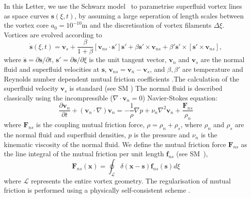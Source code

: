 \documentclass[%
 reprint,
 amsmath,amssymb,
 aps,
 prl,
]{revtex4-2}
\def \s{\mathbf{s}}
\def \v{\mathbf{v}}
\def \x{\mathbf{x}}
\begin{document}
In this Letter, we use the Schwarz model~\cite{schwarz1988} to parametrise superfluid vortex lines as space curves $\s(\xi,t)$, by assuming a large seperation of length scales between the vortex core $a_0=10^{-10}$m and the discretisation of vortex filaments $\Delta\xi$. Vortices are evolved according to
\begin{equation}
    \dot{\s}(\xi,t) = \v_s + \frac{\beta}{1+\beta}\left[\v_{ns}\cdot\s'\right]\s' + \beta\s'\times\v_{ns} + \beta'\s'\times\left[\s'\times\v_{ns}\right],
\end{equation}
where $\dot{\s} = \partial\s/\partial t$, $\s' = \partial\s/\partial\xi$ is the unit tangent vector, $\v_n$ and $\v_s$ are the normal fluid and superfluid velocities at $\s$, $\v_{ns} = \v_n-\v_s$, and $\beta,\beta'$ are temperature and Reynolds number dependent mutual friction coefficients \cite{galantucciNewSelfconsistentApproach2020b}.The calculation of the superfluid velocity $\v_s$ is standard (see SM \cite{suppMat}) The normal fluid is described classically using the incompressible ($\nabla\cdot\v_n=0$) Navier-Stokes equation:
\begin{equation}
    \frac{\partial\v_n}{\partial t} + (\v_n\cdot\nabla)\v_n = -\frac{1}{\rho}\nabla p  + \nu_n\nabla^2\v_n + \frac{\mathbf{F}_{ns}}{\rho_n}
\end{equation}
where $\mathbf{F}_{ns}$ is the coupling mutual friction force, $\rho=\rho_n + \rho_s$, where $\rho_n$ and $\rho_s$ are the normal fluid and superfluid densities, $p$ is the pressure and $\nu_n$ is the kinematic viscosity of the normal fluid. We define the mutual friction force $\mathbf{F}_{ns}$ as the line integral of the mutual friction per unit length $\mathbf{f}_{ns}$ (see SM~\cite{suppMat}),
\begin{equation}
    \mathbf{F}_{ns}(\x) = \oint_{\mathcal{L}}\delta(\x-\s)\mathbf{f}_{ns}(\s)d\xi     
\end{equation}
where $\mathcal{L}$ represents the entire vortex geometry. The regularisation of mutual friction is performed using a physically self-consistent scheme \cite{galantucciNewSelfconsistentApproach2020b, gualtieri2015exact, gualtieri2017turbulence}.
\end{document}
